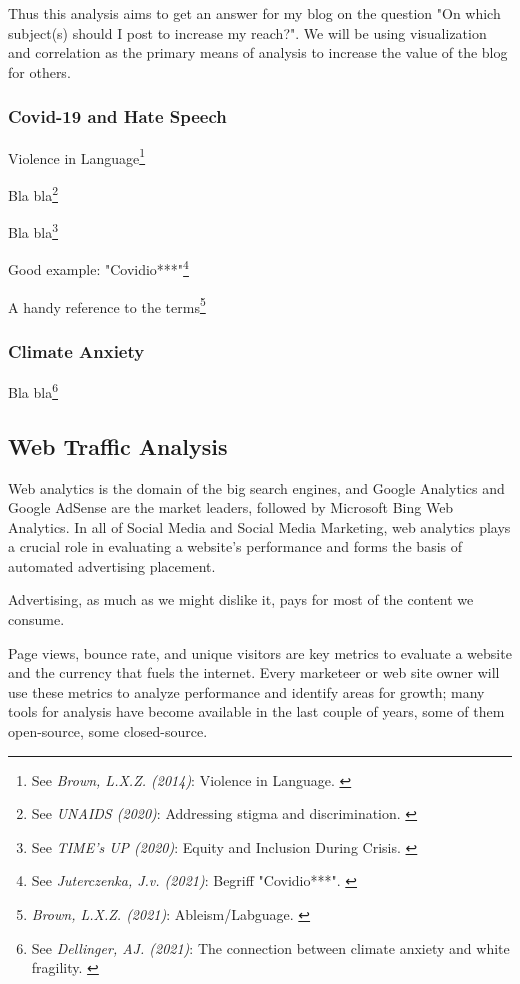 Thus this analysis aims to get an answer for my blog on the question "On which subject(s) should I post to increase my reach?". We will be using visualization and correlation as the primary means of analysis to increase the value of the blog for others.

\subsubsection{Covid-19 and Hate Speech}

Violence in Language\footnote{See \textit{Brown, L.X.Z. (2014)}: Violence in Language. \cite{violenceLanguage}}

Bla bla\footnote{See \textit{UNAIDS (2020)}: Addressing stigma and discrimination. \cite{addressingStigma}}

Bla bla\footnote{See \textit{TIME's UP (2020)}: Equity and Inclusion During Crisis. \cite{equityInclusion}}

Good example: "Covidio***"\footnote{See \textit{Juterczenka, J.v. (2021)}: Begriff "Covidio***". \cite{covidioXXX}}

A handy reference to the terms\footnote{\textit{Brown, L.X.Z. (2021)}: Ableism/Labguage. \cite{ableismLanguage}}

\subsubsection{Climate Anxiety}

Bla bla\footnote{See \textit{Dellinger, AJ. (2021)}: The connection between climate anxiety and white fragility. \cite{climateAnxiety}}

\subsection{Web Traffic Analysis}

Web analytics is the domain of the big search engines, and Google Analytics and Google AdSense are the market leaders, followed by Microsoft Bing Web Analytics. In all of Social Media and Social Media Marketing, web analytics plays a crucial role in evaluating a website's performance and forms the basis of automated advertising placement.

Advertising, as much as we might dislike it, pays for most of the content we consume.

Page views, bounce rate, and unique visitors are key metrics to evaluate a website and the currency that fuels the internet. Every marketeer or web site owner will use these metrics to analyze performance and identify areas for growth; many tools for analysis have become available in the last couple of years, some of them open-source, some closed-source.

